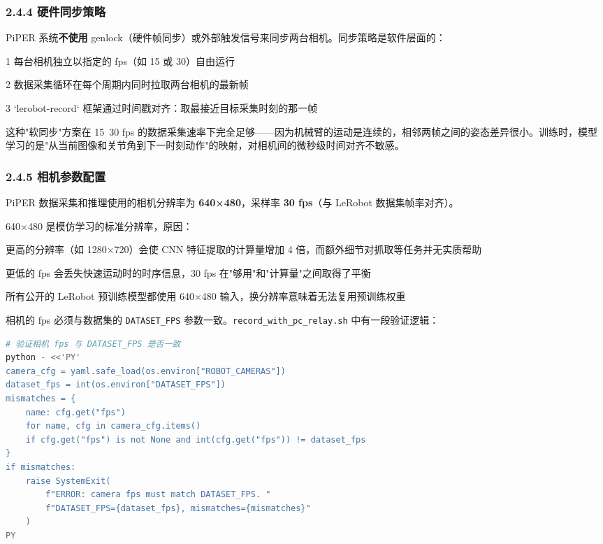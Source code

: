 \documentclass[UTF8,a4paper,11pt]{ctexart}
\begin{document}
\subsubsection{2.4.4 硬件同步策略}

PiPER 系统\textbf{不使用} genlock（硬件帧同步）或外部触发信号来同步两台相机。同步策略是软件层面的：

\item[1] 每台相机独立以指定的 fps（如 15 或 30）自由运行
\item[2] 数据采集循环在每个周期内同时拉取两台相机的最新帧
\item[3] `lerobot-record` 框架通过时间戳对齐：取最接近目标采集时刻的那一帧

这种"软同步"方案在 15~30 fps 的数据采集速率下完全足够——因为机械臂的运动是连续的，相邻两帧之间的姿态差异很小。训练时，模型学习的是"从当前图像和关节角到下一时刻动作"的映射，对相机间的微秒级时间对齐不敏感。

\subsubsection{2.4.5 相机参数配置}

PiPER 数据采集和推理使用的相机分辨率为 \textbf{640×480}，采样率 \textbf{30 fps}（与 LeRobot 数据集帧率对齐）。

640×480 是模仿学习的标准分辨率，原因：
\item 更高的分辨率（如 1280×720）会使 CNN 特征提取的计算量增加 4 倍，而额外细节对抓取等任务并无实质帮助
\item 更低的 fps 会丢失快速运动时的时序信息，30 fps 在"够用"和"计算量"之间取得了平衡
\item 所有公开的 LeRobot 预训练模型都使用 640×480 输入，换分辨率意味着无法复用预训练权重

相机的 fps 必须与数据集的 \texttt{DATASET_FPS} 参数一致。\texttt{record_with_pc_relay.sh} 中有一段验证逻辑：

\begin{lstlisting}[language=bash]
# 验证相机 fps 与 DATASET_FPS 是否一致
python - <<'PY'
camera_cfg = yaml.safe_load(os.environ["ROBOT_CAMERAS"])
dataset_fps = int(os.environ["DATASET_FPS"])
mismatches = {
    name: cfg.get("fps")
    for name, cfg in camera_cfg.items()
    if cfg.get("fps") is not None and int(cfg.get("fps")) != dataset_fps
}
if mismatches:
    raise SystemExit(
        f"ERROR: camera fps must match DATASET_FPS. "
        f"DATASET_FPS={dataset_fps}, mismatches={mismatches}"
    )
PY
\end{lstlisting}
\end{document}
